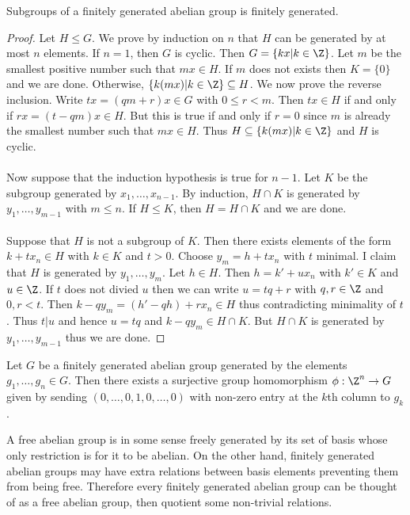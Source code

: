 \documentclass[a4paper]{article}
\begin{document}
\begin{prp}{}{} Subgroups of a finitely generated abelian group is finitely generated. \tcbline
\begin{proof}
Let $H\leq G$. We prove by induction on $n$ that $H$ can be generated by at most $n$ elements. If $n=1$, then $G$ is cyclic. Then $G=\{kx|k\in\Z\}$. Let $m$ be the smallest positive number such that $mx\in H$. If $m$ does not exists then $K=\{0\}$ and we are done. Otherwise, $\{k(mx)|k\in\Z\}\subseteq H$. We now prove the reverse inclusion. Write $tx=(qm+r)x\in G$ with $0\leq r<m$. Then $tx\in H$ if and only if $rx=(t-qm)x\in H$. But this is true if and only if $r=0$ since $m$ is already the smallest number such that $mx\in H$. Thus $H\subseteq\{k(mx)|k\in\Z\}$ and $H$ is cyclic. \\~\\
Now suppose that the induction hypothesis is true for $n-1$.  Let $K$ be the subgroup generated by $x_1,\dots,x_{n-1}$. By induction, $H\cap K$ is generated by $y_1,\dots,y_{m-1}$ with $m\leq n$. If $H\leq K$, then $H=H\cap K$ and we are done. \\~\\
Suppose that $H$ is not a subgroup of $K$. Then there exists elements of the form $k+tx_n\in H$ with $k\in K$ and $t>0$. Choose $y_m=h+tx_n$ with $t$ minimal. I claim that $H$ is generated by $y_1,\dots,y_m$. Let $h\in H$. Then $h=k'+ux_n$ with $k'\in K$ and $u\in\Z$. If $t$ does not divied $u$ then we can write $u=tq+r$ with $q,r\in\Z$ and $0,r<t$. Then $k-qy_m=(h'-qh)+rx_n\in H$ thus contradicting minimality of $t$. Thus $t|u$ and hence $u=tq$ and $k-qy_m\in H\cap K$. But $H\cap K$ is generated by $y_1,\dots,y_{m-1}$ thus we are done. 
\end{proof}
\end{prp}

\begin{prp}{}{} Let $G$ be a finitely generated abelian group generated by the elements $g_1,\dots,g_n\in G$. Then there exists a surjective group homomorphism $\phi:\Z^n\to G$ given by sending $(0,\dots,0,1,0,\dots,0)$ with non-zero entry at the $k$th column to $g_k$. 
\end{prp}

A free abelian group is in some sense freely generated by its set of basis whose only restriction is for it to be abelian. On the other hand, finitely generated abelian groups may have extra relations between basis elements preventing them from being free. Therefore every finitely generated abelian group can be thought of as a free abelian group, then quotient some non-trivial relations. 
\end{document}
